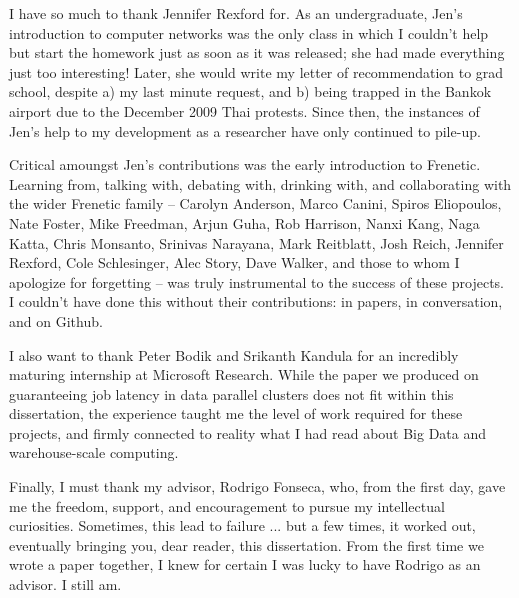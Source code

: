 I have so much to thank Jennifer Rexford for. As an undergraduate, Jen's
introduction to computer networks was the only class in which I couldn't help
but start the homework just as soon as it was released; she had made everything
just too interesting! Later, she would write my letter of recommendation to
grad school, despite a) my last minute request, and b) being trapped in the
Bankok airport due to the December 2009 Thai protests. Since then, the instances 
of Jen's help to my development as a researcher have only continued to pile-up.

Critical amoungst Jen's contributions was the early introduction to Frenetic.
Learning from, talking with, debating with, drinking with, and collaborating
with the wider Frenetic family --
Carolyn Anderson, Marco Canini, Spiros Eliopoulos, Nate Foster, Mike Freedman,
Arjun Guha, Rob Harrison, Nanxi Kang, Naga Katta, Chris Monsanto, Srinivas Narayana,
Mark Reitblatt, Josh Reich, Jennifer Rexford, Cole Schlesinger, Alec Story,
Dave Walker, and those to whom I apologize for forgetting
-- was truly instrumental to the success of these projects.
I couldn't have done this without their contributions: in papers, in conversation,
and on Github.

I also want to thank Peter Bodik and Srikanth Kandula for an incredibly maturing
internship at Microsoft Research. While the paper we produced on guaranteeing job
latency in data parallel clusters does not fit
within this dissertation, the experience taught me the level of work required for
these projects, and firmly connected to reality what I had read about Big Data
and warehouse-scale computing.

Finally, I must thank my advisor, Rodrigo Fonseca, who, from the first day,
gave me the freedom, support, and encouragement to pursue my intellectual
curiosities. Sometimes, this lead to failure ... but a few times, it worked out,
eventually bringing you, dear reader, this dissertation. From the first time
we wrote a paper together, I knew for certain I was lucky to have Rodrigo
as an advisor. I still am.
